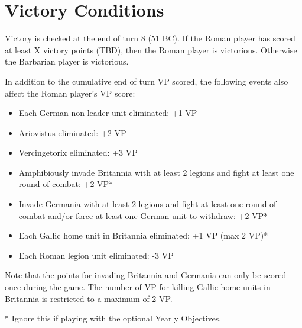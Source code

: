 \section{Victory Conditions}
\par
Victory is checked at the end of turn 8 (51 BC). If the Roman player has scored at least X victory points (TBD), then the Roman player is victorious. Otherwise the Barbarian player is victorious.

In addition to the cumulative end of turn VP scored, the following events also affect the Roman player's VP score:

\begin{itemize}
  \setlength\itemsep{0em}
  \item Each German non-leader unit eliminated: +1 VP
  \item Ariovistus eliminated: +2 VP
  \item Vercingetorix eliminated: +3 VP
  \item Amphibiously invade Britannia with at least 2 legions and fight at least one round of combat: +2 VP*
  \item Invade Germania with at least 2 legions and fight at least one round of combat and/or force at least one German unit to withdraw: +2 VP*
  \item Each Gallic home unit in Britannia eliminated: +1 VP (max 2 VP)*
  \item Each Roman legion unit eliminated: -3 VP
\end{itemize}

Note that the points for invading Britannia and Germania can only be scored once during the game. The number of VP for killing Gallic home units in Britannia is restricted to a maximum of 2 VP.

* Ignore this if playing with the optional Yearly Objectives.